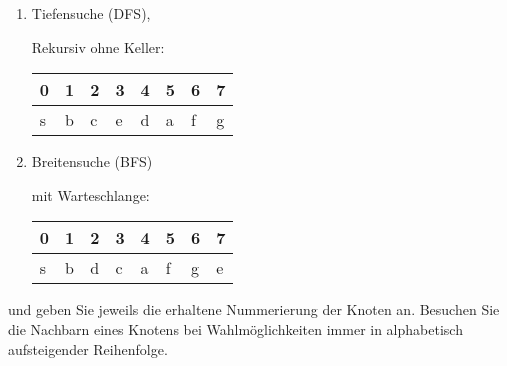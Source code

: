 \documentclass{bschlangaul-aufgabe}
\begin{document}
\begin{enumerate}


\item Tiefensuche (DFS),

\begin{bAntwort}
Rekursiv ohne Keller:

\begin{tabular}{llllllll}
0 & 1 & 2 & 3 & 4 & 5 & 6 & 7 \\\hline
s & b & c & e & d & a & f & g \\
\end{tabular}
\end{bAntwort}


\item Breitensuche (BFS)

\begin{bAntwort}
mit Warteschlange:

\begin{tabular}{llllllll}
0 & 1 & 2 & 3 & 4 & 5 & 6 & 7 \\\hline
s & b & d & c & a & f & g & e \\
\end{tabular}
\end{bAntwort}
\end{enumerate}

\noindent
und geben Sie jeweils die erhaltene Nummerierung der Knoten an. Besuchen
Sie die Nachbarn eines Knotens bei Wahlmöglichkeiten immer in
alphabetisch aufsteigender Reihenfolge.
\end{document}
